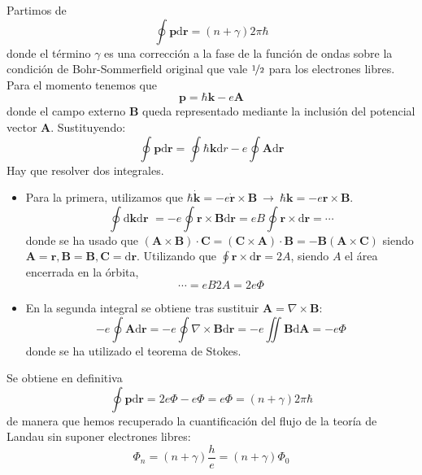 Partimos de
\begin{equation}
  \oint \mathbf{p} \text{d} \textbf{r} = (n + \gamma)2\pi \hbar
\end{equation}
donde el término $\gamma$ es una corrección a la fase de la función de
ondas sobre la condición de Bohr-Sommerfield original que vale
$\nicefrac{1}{2}$ para los electrones libres. Para el momento tenemos
que
\begin{equation}
  \mathbf{p} = \hbar \mathbf{k} -e \mathbf{A}
\end{equation}
donde el campo externo $\mathbf{B}$ queda representado mediante la
inclusión del potencial vector $\mathbf{A}$. Sustituyendo:
\begin{equation}
  \oint \textbf{p} \text{d}\textbf{r} = \oint \hbar \textbf{k} \text{d}r - e
  \oint \textbf{A} \text{d}\textbf{r}
\end{equation}
Hay que resolver dos integrales.
\begin{itemize}
\item Para la primera, utilizamos que $\hbar \dot{\textbf{k}} = -e \dot{\textbf{r}}\times
\textbf{B} \ \rightarrow \ \hbar \textbf{k} = -e \textbf{r} \times \textbf{B}$.
\begin{equation}
    \oint \text{d} \textbf{k} \text{d} \textbf{r }= -e \oint \textbf{r} \times \textbf{B} \text{d}
    \textbf{r} = e B \oint \textbf{r}\times
    \text{d}\textbf{r} = \cdots
\end{equation}
donde se ha usado que $(\textbf{A}\times \textbf{B})\cdot \textbf{C} =
(\textbf{C}\times \textbf{A})\cdot \textbf{B} = -
\textbf{B}(\textbf{A}\times \textbf{C})$ siendo
$\textbf{A}=\textbf{r}, \textbf{B} = \textbf{B}, \textbf{C} =
\text{d}\textbf{r}$. Utilizando que $\oint \textbf{r} \times
\text{d}\textbf{r} = 2A$, siendo $A$ el área encerrada en la órbita,
\begin{equation}
  \cdots = e B 2 A = 2e \Phi
\end{equation}
\item En la segunda integral se obtiene tras sustituir $\textbf{A} =
  \nabla \times \textbf{B}$:
  \begin{equation}
    -e \oint \textbf{A} \text{d}\textbf{r} = -e \oint \nabla \times
    \textbf{B} \text{d} \textbf{r} = -e \iint \textbf{B}
    \text{d}\textbf{A} = -e \Phi
  \end{equation}
  donde se ha utilizado el teorema de Stokes.
\end{itemize}
Se obtiene en definitiva
\begin{equation}
  \oint \textbf{p} \text{d}\textbf{r} = 2e \Phi - e \Phi = e \Phi =
  (n+\gamma)2\pi \hbar
\end{equation}
de manera que hemos recuperado la cuantificación del flujo de la
teoría de Landau sin suponer electrones libres:
\begin{equation}
  \Phi_n = (n + \gamma) \frac{h}{e} = (n+\gamma) \Phi_0
\end{equation}

